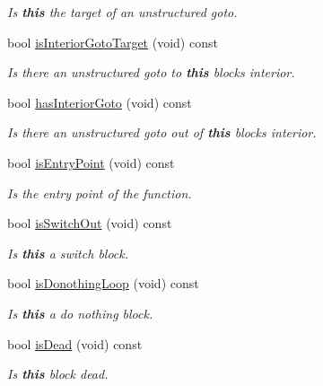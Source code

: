 \begin{DoxyCompactItemize}
\begin{DoxyCompactList}\small\item\em Is {\bfseries{this}} the target of an unstructured goto. \end{DoxyCompactList}\item 
bool \mbox{\hyperlink{class_flow_block_a7b40aa6b0c04a9f6aad63e3b21edbf20}{is\+Interior\+Goto\+Target}} (void) const
\begin{DoxyCompactList}\small\item\em Is there an unstructured goto to {\bfseries{this}} block\textquotesingle{}s interior. \end{DoxyCompactList}\item 
bool \mbox{\hyperlink{class_flow_block_a3eb121264843793d0bb58704c05ee710}{has\+Interior\+Goto}} (void) const
\begin{DoxyCompactList}\small\item\em Is there an unstructured goto out of {\bfseries{this}} block\textquotesingle{}s interior. \end{DoxyCompactList}\item 
bool \mbox{\hyperlink{class_flow_block_a3dbd95abe3b349bdfc87a89350fe21e5}{is\+Entry\+Point}} (void) const
\begin{DoxyCompactList}\small\item\em Is the entry point of the function. \end{DoxyCompactList}\item 
bool \mbox{\hyperlink{class_flow_block_ab80d8989ba2b6e2046003367e478c951}{is\+Switch\+Out}} (void) const
\begin{DoxyCompactList}\small\item\em Is {\bfseries{this}} a switch block. \end{DoxyCompactList}\item 
bool \mbox{\hyperlink{class_flow_block_a5489d98885f751ce20cf2badd93da3c7}{is\+Donothing\+Loop}} (void) const
\begin{DoxyCompactList}\small\item\em Is {\bfseries{this}} a {\itshape do} {\itshape nothing} block. \end{DoxyCompactList}\item 
bool \mbox{\hyperlink{class_flow_block_a964ff95b80c1427aa81bc2c1abe7aee2}{is\+Dead}} (void) const
\begin{DoxyCompactList}\small\item\em Is {\bfseries{this}} block dead. \end{DoxyCompactList}\item 

\end{DoxyCompactItemize}
